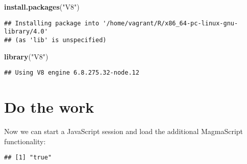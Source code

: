 \documentclass[
]{book}
\newenvironment{Shaded}{\begin{snugshade}}{\end{snugshade}}
\newcommand{\DataTypeTok}[1]{\textcolor[rgb]{0.13,0.29,0.53}{#1}}
\newcommand{\KeywordTok}[1]{\textcolor[rgb]{0.13,0.29,0.53}{\textbf{#1}}}
\newcommand{\NormalTok}[1]{#1}
\newcommand{\OperatorTok}[1]{\textcolor[rgb]{0.81,0.36,0.00}{\textbf{#1}}}
\newcommand{\StringTok}[1]{\textcolor[rgb]{0.31,0.60,0.02}{#1}}
\begin{document}
\begin{Shaded}
\begin{Highlighting}[]
\KeywordTok{install.packages}\NormalTok{(}\StringTok{"V8"}\NormalTok{)}
\end{Highlighting}
\end{Shaded}

\begin{verbatim}
## Installing package into '/home/vagrant/R/x86_64-pc-linux-gnu-library/4.0'
## (as 'lib' is unspecified)
\end{verbatim}

\begin{Shaded}
\begin{Highlighting}[]
\KeywordTok{library}\NormalTok{(}\StringTok{"V8"}\NormalTok{)}
\end{Highlighting}
\end{Shaded}

\begin{verbatim}
## Using V8 engine 6.8.275.32-node.12
\end{verbatim}

\hypertarget{do-the-work}{%
\section{Do the work}\label{do-the-work}}

Now we can start a JavaScript session and load the additional MagmaScript functionality:

\begin{Shaded}
\end{Shaded}

\begin{verbatim}
## [1] "true"
\end{verbatim}

\begin{Shaded}
\end{Shaded}
\end{document}
